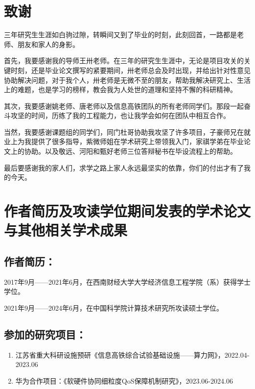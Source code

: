 \chapter[致谢]{致\quad 谢}%

三年研究生生涯如白驹过隙，转瞬间又到了毕业的时刻，此刻回首，一路都是老师、朋友和家人的身影。

首先，我要感谢我的导师王卅老师。在三年的研究生生涯中，无论是项目攻关的关键时刻，还是毕业论文撰写的紧要期间，卅老师总会及时出现，并给出针对性意见协助解决问题，对于我个人，卅老师是无微不至的朋友，帮助我解决研究上、生活上的难题，也是学习的榜样，教会我为人处世的道理和坚持不懈的科研精神。

其次，我要感谢姚老师、唐老师以及信息高铁团队的所有老师同学们。那段一起奋斗攻坚的时间，历练了我的工程能力，也让我学会如何在团队中相互合作。

当然，我要感谢课题组的同学们，同门杜哥协助我攻坚了许多项目，子豪师兄在就业上为我提供了很多指导，紫微师姐在学术研究上带领我入门，家祺学弟在毕业论文上的协助。以及敬远、河阳和甄好老师三位答辩秘书在毕设流程上的帮助。

最后要感谢我的家人们，求学之路上家人永远最坚实的依靠，你们的付出才有了我的今天。


\chapter{作者简历及攻读学位期间发表的学术论文与其他相关学术成果}

\section*{作者简历：}

2017年9月——2021年6月，在西南财经大学大学经济信息工程学院（系）获得学士学位。

2021年9月——2024年6月，在中国科学院计算技术研究所攻读硕士学位。

\section*{参加的研究项目：}

\begin{enumerate}
    \item 江苏省重大科研设施预研《信息高铁综合试验基础设施——算力网》，2022.04-2023.06
    \item 华为合作项目：《软硬件协同细粒度QoS保障机制研究》，2023.06-2024.06
\end{enumerate}


\cleardoublepage[plain]%
